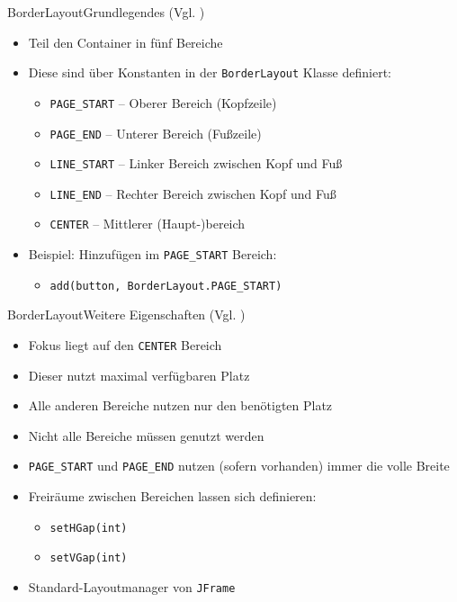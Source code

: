 \begin{frame}{BorderLayout}{Grundlegendes (Vgl. \cite{orac:borderlayout})}
    \begin{itemize}
        \item Teil den Container in fünf Bereiche
        \item Diese sind über Konstanten in der \texttt{BorderLayout} Klasse definiert:
        \begin{itemize}
            \item \texttt{PAGE\_START} -- Oberer Bereich (Kopfzeile)
            \item \texttt{PAGE\_END} -- Unterer Bereich (Fußzeile)
            \item \texttt{LINE\_START} -- Linker Bereich zwischen Kopf und Fuß
            \item \texttt{LINE\_END} -- Rechter Bereich zwischen Kopf und Fuß
            \item \texttt{CENTER} -- Mittlerer (Haupt-)bereich
        \end{itemize}
        \item Beispiel: Hinzufügen im \texttt{PAGE\_START} Bereich:
        \begin{itemize}
            \item \texttt{add(button, BorderLayout.PAGE\_START)}
        \end{itemize}        
    \end{itemize}
\end{frame}

\begin{frame}{BorderLayout}{Weitere Eigenschaften (Vgl. \cite{orac:borderlayout})}
    \begin{itemize}
        \item Fokus liegt auf den \texttt{CENTER} Bereich
        \item Dieser nutzt maximal verfügbaren Platz
        \item Alle anderen Bereiche nutzen nur den benötigten Platz
        \item Nicht alle Bereiche müssen genutzt werden
        \item \texttt{PAGE\_START} und \texttt{PAGE\_END} nutzen (sofern vorhanden) immer die volle Breite
        \item Freiräume zwischen Bereichen lassen sich definieren:
        \begin{itemize}
            \item \texttt{setHGap(int)}
            \item \texttt{setVGap(int)}
        \end{itemize}
        \item Standard-Layoutmanager von \texttt{JFrame}
    \end{itemize}
\end{frame}

